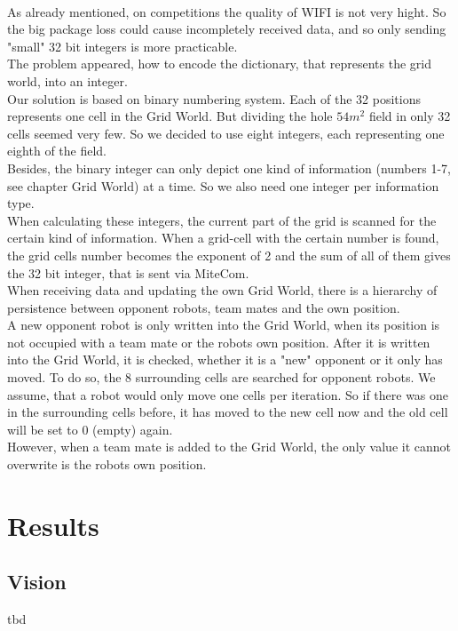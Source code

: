 \documentclass[lnicst,a4paper]{svmultln}
\begin{document}
\\
As already mentioned, on competitions the quality of WIFI is not very hight. So the big package loss could cause incompletely received data, and so only sending "small" 32 bit integers is more practicable. 
\\
The problem appeared, how to encode the dictionary, that represents the grid world, into an integer.
\\
Our solution is based on binary numbering system. Each of the 32 positions represents one cell in the Grid World. But dividing the hole $54m^2$ field in only 32 cells seemed very few. So we decided to use eight integers, each representing one eighth of the field.
\\
Besides, the binary integer can only depict one kind of information (numbers 1-7, see chapter Grid World) at a time. So we also need one integer per information type.
\\
When calculating these integers, the current part of the grid is scanned for the certain kind of information. When a grid-cell with the certain number is found, the grid cells number becomes the exponent of 2 and the sum of all of them gives the 32 bit integer, that is sent via MiteCom.
\\
When receiving data and updating the own Grid World, there is a hierarchy of persistence between opponent robots, team mates and the own position. 
\\
A new opponent robot is only written into the Grid World, when its position is not occupied with a team mate or the robots own position. After it is written into the Grid World, it is checked, whether it is a "new" opponent or it only has moved. To do so, the 8 surrounding cells are searched for opponent robots. We assume, that a robot would only move one cells per iteration. So if there was one in the surrounding cells before, it has moved to the new cell now and the old cell will be set to 0 (empty) again.
\\
However, when a team mate is added to the Grid World, the only value it cannot overwrite is the robots own position.


\section{Results}

\subsection{Vision}
\label{sec:results_vision}
tbd
\end{document}
